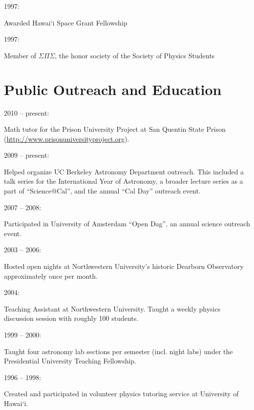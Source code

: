 \documentclass[12pt]{article}
\begin{document}
\begin{bf}1997:  \end{bf}Awarded Hawai`i Space Grant Fellowship

\begin{bf}1997:  \end{bf}Member of $\Sigma\Pi\Sigma$, the honor society of the Society of Physics Students

\section{Public Outreach and Education}
\indent

\begin{bf}2010 -- present:  \end{bf} Math tutor for the Prison University Project at San Quentin State Prison (\url{http://www.prisonuniversityproject.org}).

\begin{bf}2009 -- present:  \end{bf}Helped organize UC Berkeley Astronomy Department outreach.  This included a talk series for the International Year of Astronomy, a broader lecture series as a part of ``Science@Cal'', and the annual ``Cal Day'' outreach event.

\begin{bf}2007 -- 2008:  \end{bf}Participated in University of Amsterdam ``Open Dag'', an annual science outreach event.

\begin{bf}2003 -- 2006:  \end{bf}Hosted open nights at Northwestern University's historic Dearborn Observatory approximately once per month.

\begin{bf}2004:  \end{bf}Teaching Assistant at Northwestern University.  Taught a weekly physics discussion session with roughly 100 students.

\begin{bf}1999 -- 2000:  \end{bf}Taught four astronomy lab sections per semester (incl. night labs) under the Presidential University Teaching Fellowship.

\begin{bf}1996 -- 1998:  \end{bf}Created and participated in volunteer physics tutoring service at University of Hawai`i.
\end{document}

